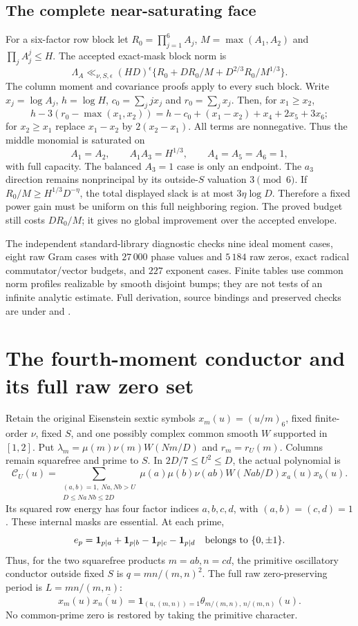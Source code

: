 \documentclass[11pt,oneside,openany]{book}
\theoremstyle{definition}\newtheorem{definition}[theorem]{Definition}
\theoremstyle{remark}\newtheorem{remark}[theorem]{Remark}
\begin{document}
\subsection{The complete near-saturating face}
For a six-factor row block let $R_0=\prod_{j=1}^6A_j$,
$M=\max(A_1,A_2)$ and $\prod_j A_j^j\le H$.
The accepted exact-mask block norm is
\[
 \Lambda_A\ll_{\nu,S,\epsilon}(HD)^\epsilon
 \{R_0+DR_0/M+D^{2/3}R_0/M^{1/3}\}.
\]
The column moment and covariance proofs apply to every such block.
Write $x_j=\log A_j$, $h=\log H$, $c_0=\sum_jjx_j$ and
$r_0=\sum_jx_j$. Then, for $x_1\ge x_2$,
\[
 h-3(r_0-\max(x_1,x_2))
 =h-c_0+(x_1-x_2)+x_4+2x_5+3x_6;
\]
for $x_2\ge x_1$ replace $x_1-x_2$ by $2(x_2-x_1)$.
All terms are nonnegative. Thus the middle monomial is saturated on
\[
 A_1=A_2,\qquad A_1A_3=H^{1/3},\qquad A_4=A_5=A_6=1,
\]
with full capacity. The balanced $A_3=1$ case is only an endpoint.
The $a_3$ direction remains nonprincipal by its outside-$S$ valuation
$3\pmod6$. If $R_0/M\ge H^{1/3}D^{-\eta}$, the total displayed slack
is at most $3\eta\log D$. Therefore a fixed power gain must be uniform
on this full neighboring region. The proved budget still costs $DR_0/M$;
it gives no global improvement over the accepted envelope.

The independent standard-library diagnostic checks nine ideal moment
cases, eight raw Gram cases with $27\,000$ phase values and $5\,184$ raw
zeros, exact radical commutator/vector budgets, and $227$ exponent cases.
Finite tables use common norm profiles realizable by smooth disjoint bumps;
they are not tests of an infinite analytic estimate. Full derivation,
source bindings and preserved checks are under
 and
.

\section{The fourth-moment conductor and its full raw zero set}
\label{upq:core}
Retain the original Eisenstein sextic symbols $x_m(u)=(u/m)_6$,
fixed finite-order $\nu$, fixed $S$, and one possibly complex common
smooth $W$ supported in $[1,2]$. Put
$\lambda_m=\mu(m)\nu(m)W(Nm/D)$ and $r_m=r_U(m)$.
Columns remain squarefree and prime to $S$. In $2D/7\le U^2\le D$, the actual polynomial is
\[
 \mathcal C_U(u)=
 \sum_{\substack{(a,b)=1,\ Na,Nb>U\\D\le Na\,Nb\le2D}}
 \mu(a)\mu(b)\nu(ab)W(Nab/D)x_a(u)x_b(u).
\]
Its squared row energy has four factor indices $a,b,c,d$, with
$(a,b)=(c,d)=1$. These internal masks are essential. At each prime,
\[
 e_p=\mathbf1_{p\mid a}+\mathbf1_{p\mid b}
       -\mathbf1_{p\mid c}-\mathbf1_{p\mid d}
 \quad\hbox{belongs to }\{0,\pm1\}.
\]
Thus, for the two squarefree products $m=ab,n=cd$, the primitive
oscillatory conductor outside fixed $S$ is $q=mn/(m,n)^2$.
The full raw zero-preserving period is $L=mn/(m,n)$:
\[
 x_m(u)\overline{x_n(u)}
 =\mathbf1_{(u,(m,n))=1}\theta_{m/(m,n),\,n/(m,n)}(u).
\]
No common-prime zero is restored by taking the primitive character.
\end{document}
